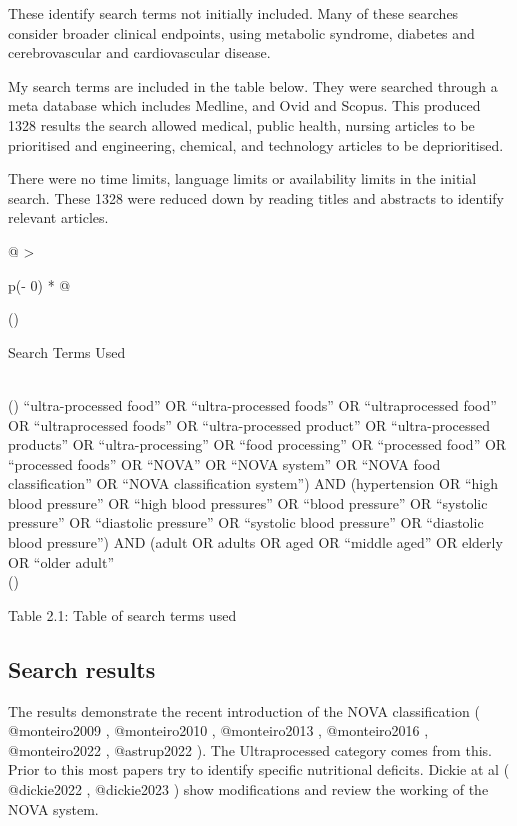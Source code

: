 \documentclass[
]{article}
\begin{document}
These identify search terms not initially included. Many of these
searches consider broader clinical endpoints, using metabolic syndrome,
diabetes and cerebrovascular and cardiovascular disease.

My search terms are included in the table below. They were searched
through a meta database which includes Medline, and Ovid and Scopus.
This produced 1328 results the search allowed medical, public health,
nursing articles to be prioritised and engineering, chemical, and
technology articles to be deprioritised.

There were no time limits, language limits or availability limits in the
initial search. These 1328 were reduced down by reading titles and
abstracts to identify relevant articles.

\begin{longtable}[]{@{}
  >{\raggedright\arraybackslash}p{(\columnwidth - 0\tabcolsep) * }@{}}
\toprule()
\begin{minipage}[b]{\linewidth}\raggedright
Search Terms Used
\end{minipage} \\
\midrule()
\endhead
``ultra-processed food'' OR ``ultra-processed foods'' OR
``ultraprocessed food'' OR ``ultraprocessed foods'' OR ``ultra-processed
product'' OR ``ultra-processed products'' OR ``ultra-processing'' OR
``food processing'' OR ``processed food'' OR ``processed foods'' OR
``NOVA'' OR ``NOVA system'' OR ``NOVA food classification'' OR ``NOVA
classification system'') AND (hypertension OR ``high blood pressure'' OR
``high blood pressures'' OR ``blood pressure'' OR ``systolic pressure''
OR ``diastolic pressure'' OR ``systolic blood pressure'' OR ``diastolic
blood pressure'') AND (adult OR adults OR aged OR ``middle aged'' OR
elderly OR ``older adult'' \\
\bottomrule()
\end{longtable}

Table 2.1: Table of search terms used

\hypertarget{search-results}{%
\subsection{Search results}\label{search-results}}

The results demonstrate the recent introduction of the NOVA
classification ( @monteiro2009 , @monteiro2010 , @monteiro2013 ,
@monteiro2016 , @monteiro2022 , @astrup2022 ). The Ultraprocessed
category comes from this. Prior to this most papers try to identify
specific nutritional deficits. Dickie at al ( @dickie2022 , @dickie2023
) show modifications and review the working of the NOVA system.
\end{document}
